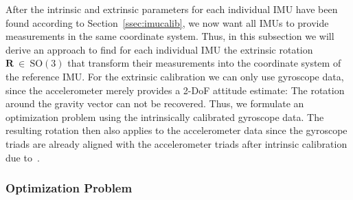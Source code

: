 \documentclass[journal]{IEEEtran}
\begin{document}
After the intrinsic and extrinsic parameters for each individual IMU have been
found according to Section~\ref{ssec:imucalib}, we now want all IMUs to provide
measurements in the same coordinate system. Thus, in this subsection we will
derive an approach to find for each individual IMU the extrinsic rotation $\mathbf{R}~\in~\text{SO}(3)$ that transform
their measurements into the coordinate system of the reference IMU.
For the extrinsic calibration we can only use gyroscope data, since the accelerometer merely provides a 2-DoF attitude estimate:
The rotation around the gravity vector can not be recovered.
Thus, we formulate an optimization problem using the intrinsically calibrated gyroscope data.
The resulting rotation then also applies to the accelerometer data since the gyroscope triads are already aligned with the accelerometer triads after intrinsic calibration due to~\cite{imutk2014}.
\newline

\subsubsection{Optimization Problem}
\end{document}
